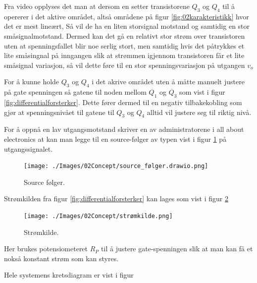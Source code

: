 Fra video \cite{feyling_2022_aktiv} opplyses det man at dersom en setter transistorene $Q_3$ og $Q_4$ til å opererer i det aktive området, altså områdene på figur \ref{fig:02karakteristikk} hvor det er mest lineært, Så vil de ha en liten storsignal motstand og samtidig en stor småsignalmotstand. Dermed kan det gå en relativt stor strøm over transistoren uten at spenningsfallet blir noe serlig stort, men samtidig hvis det påtrykkes et lite småsingnal på inngangen slik at strømmen igjennom transistoren får et lite småsignal variasjon, så vil dette føre til en stor spenningsvariasjon på utgangen $v_o$

For å kunne holde $Q_3$ og $Q_4$ i det akrive området uten å måtte manuelt justere på gate spenningen så gatene til noden mellom $Q_1$ og $Q_3$ som vist i figur \ref{fig:differentialforsterker}. Dette fører dermed til en negativ tilbakekobling som gjør at spenningsnivået til gatene til $Q_3$ og $Q_4$ alltid vil justere seg til riktig nivå.

For å oppnå en lav utgangsmotstand skriver en  av administratorene i all about electronics \cite{admin_2021_mosfet} at kan man legge til en source-følger av typen vist i figur \ref{fig:source} på utgangssignalet.

\begin{figure}[!hbt]
	\centering
	\texttt{[image: ./Images/02Concept/source\_følger.drawio.png]}
	\caption{Source følger.}
	\label{fig:source}
\end{figure}

Strømkilden fra figur \ref{fig:differentialforsterker} kan lages som vist i figur \ref{fig:strømkilde}

\begin{figure}[!hbt]
	\centering
	\texttt{[image: ./Images/02Concept/strømkilde.png]}
	\caption{Strømkilde.}
	\label{fig:strømkilde}
\end{figure}

Her brukes potensiometeret $R_P$ til å justere gate-spenningen slik at man kan få et nokså konstant strøm som kan styres. 

Hele systemens kretsdiagram er vist i figur

